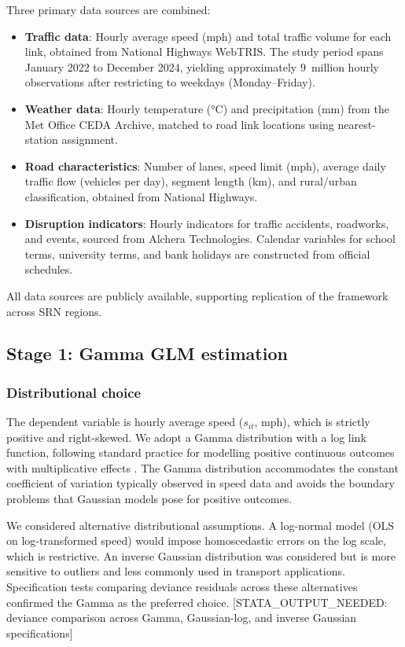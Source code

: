 \documentclass[review]{elsarticle}
\begin{document}
Three primary data sources are combined:

\begin{itemize}
    \item \textbf{Traffic data}: Hourly average speed (mph) and total traffic volume for each link, obtained from National Highways WebTRIS. The study period spans January 2022 to December 2024, yielding approximately 9~million hourly observations after restricting to weekdays (Monday--Friday).
    \item \textbf{Weather data}: Hourly temperature (\si{\degreeCelsius}) and precipitation (\si{mm}) from the Met Office CEDA Archive, matched to road link locations using nearest-station assignment.
    \item \textbf{Road characteristics}: Number of lanes, speed limit (\si{mph}), average daily traffic flow (vehicles per day), segment length (\si{km}), and rural/urban classification, obtained from National Highways.
    \item \textbf{Disruption indicators}: Hourly indicators for traffic accidents, roadworks, and events, sourced from Alchera Technologies. Calendar variables for school terms, university terms, and bank holidays are constructed from official schedules.
\end{itemize}

All data sources are publicly available, supporting replication of the framework across SRN regions.


\subsection{Stage 1: Gamma GLM estimation}
\label{sec:method:glm}

\subsubsection{Distributional choice}

The dependent variable is hourly average speed ($s_{it}$, mph), which is strictly positive and right-skewed. We adopt a Gamma distribution with a log link function, following standard practice for modelling positive continuous outcomes with multiplicative effects \citep{mccullagh1989glm,nelder1972glm}. The Gamma distribution accommodates the constant coefficient of variation typically observed in speed data and avoids the boundary problems that Gaussian models pose for positive outcomes.

We considered alternative distributional assumptions. A log-normal model (OLS on log-transformed speed) would impose homoscedastic errors on the log scale, which is restrictive. An inverse Gaussian distribution was considered but is more sensitive to outliers and less commonly used in transport applications. Specification tests comparing deviance residuals across these alternatives confirmed the Gamma as the preferred choice. [STATA\_OUTPUT\_NEEDED: deviance comparison across Gamma, Gaussian-log, and inverse Gaussian specifications]
\end{document}
